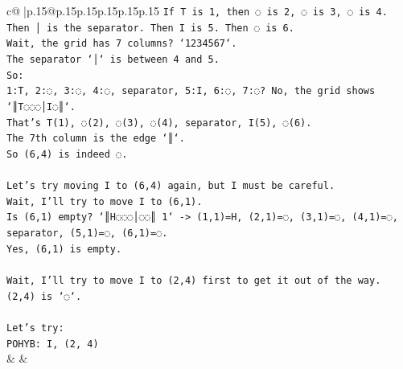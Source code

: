 \documentclass{article}
\begin{document}
{\begin{supertabular}{c@{$\;$}|p{.15\linewidth}@{}p{.15\linewidth}p{.15\linewidth}p{.15\linewidth}p{.15\linewidth}p{.15\linewidth}}
{{{\texttt{If T is 1, then ◌ is 2, ◌ is 3, ◌ is 4. Then │ is the separator. Then I is 5. Then ◌ is 6.} \\
\texttt{Wait, the grid has 7 columns? `1234567`.} \\
\texttt{The separator `│` is between 4 and 5.} \\
\texttt{So:} \\
\texttt{1:T, 2:◌, 3:◌, 4:◌, separator, 5:I, 6:◌, 7:◌? No, the grid shows `║T◌◌◌│I◌║`.} \\
\texttt{That's T(1), ◌(2), ◌(3), ◌(4), separator, I(5), ◌(6).} \\
\texttt{The 7th column is the edge `║`.} \\
\texttt{So (6,4) is indeed ◌.} \\
\\ 
\texttt{Let's try moving I to (6,4) again, but I must be careful.} \\
\texttt{Wait, I'll try to move I to (6,1).} \\
\texttt{Is (6,1) empty? `║H◌◌◌│◌◌║ 1` {-}> (1,1)=H, (2,1)=◌, (3,1)=◌, (4,1)=◌, separator, (5,1)=◌, (6,1)=◌.} \\
\texttt{Yes, (6,1) is empty.} \\
\\ 
\texttt{Wait, I'll try to move I to (2,4) first to get it out of the way.} \\
\texttt{(2,4) is `◌`.} \\
\\ 
\texttt{Let's try:} \\
\texttt{POHYB: I, (2, 4)} \\
            }
        }
    }
    & & \\ \\


\end{supertabular}}
\end{document}
